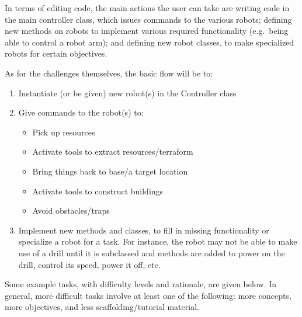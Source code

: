 \documentclass[12pt,notitlepage]{article}
\begin{document}
In terms of editing code, the main actions the user can take are
writing code in the main controller class, which issues commands to
the various robots; defining new methods on robots to implement
various required functionality (e.g.\ being able to control a robot
arm); and defining new robot classes, to make specialized robots for
certain objectives.

As for the challenges themselves, the basic flow will be to:

\begin{enumerate}
\item Instantiate (or be given) new robot(s) in the Controller class
\item Give commands to the robot(s) to:
  \begin{itemize}
  \item Pick up resources
  \item Activate tools to extract resources/terraform
  \item Bring things back to base/a target location
  \item Activate tools to construct buildings
  \item Avoid obstacles/traps
  \end{itemize}
\item Implement new methods and classes, to fill in missing
  functionality or specialize a robot for a task. For instance, the
  robot may not be able to make use of a drill until it is subclassed
  and methods are added to power on the drill, control its speed,
  power it off, etc.
\end{enumerate}

Some example tasks, with difficulty levels and rationale, are given
below. In general, more difficult tasks involve at least one of the
following: more concepts, more objectives, and less
scaffolding/tutorial material.
\end{document}
